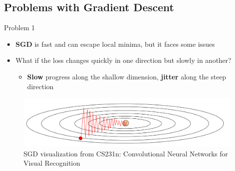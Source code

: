 \documentclass[serif, aspectratio=169]{beamer}
\begin{document}
\subsection{Problems with Gradient Descent}
\begin{frame}{Problem 1}
    \begin{itemize}
        \item \textbf{SGD} is fast and can escape local minima, but it faces some issues
        \item What if the loss changes quickly in one direction but slowly in another?
        \begin{itemize}
            \item \textbf{Slow} progress along the shallow dimension, \textbf{jitter} along the steep direction
        \end{itemize}
    \end{itemize}
    \hfill
    \hfill
    \begin{center}
        \begin{figure}
            \includegraphics[width=1\linewidth]{pic/sgd_stanford.png}
            \caption{\footnotesize SGD visualization from CS231n: Convolutional Neural Networks for Visual Recognition}
        \end{figure}
    \end{center}
\end{frame}
\end{document}
